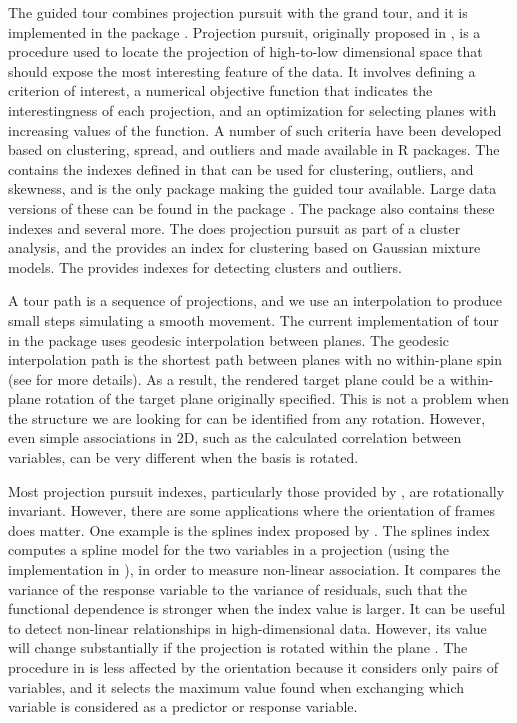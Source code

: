 The guided tour combines projection pursuit with the grand tour, and it is implemented in the  package \citep{tourr}. Projection pursuit, originally proposed in \citet{kruskal_1969}, is a procedure used to locate the projection of high-to-low dimensional space that should expose the most interesting feature of the data. It involves defining a criterion of interest, a numerical objective function that indicates the interestingness of each projection, and an optimization for selecting planes with increasing values of the function. A number of such criteria have been developed based on clustering, spread, and outliers and made available in R packages. The  contains the indexes defined in \citet{cook1993} that can be used for clustering, outliers, and skewness, and is the only package making the guided tour available. Large data versions of these can be found in the package  \citep{ppbigdata}. The package  \citep{pursuit} also contains these indexes and several more. The  \citep{ppci} does projection pursuit as part of a cluster analysis, and the  \citep{ppgmmga} provides an index for clustering based on Gaussian mixture models. The  \citep{REPPlab} provides indexes for detecting clusters and outliers.

A tour path is a sequence of projections, and we use an interpolation to produce small steps simulating a smooth movement. The current implementation of tour in the  package uses geodesic interpolation between planes. The geodesic interpolation path is the shortest path between planes with no within-plane spin (see \citet{Buja2004TheoryOD} for more details). As a result, the rendered target plane could be a within-plane rotation of the target plane originally specified. This is not a problem when the structure we are looking for can be identified from any rotation. However, even simple associations in 2D, such as the calculated correlation between variables, can be very different when the basis is rotated.

Most projection pursuit indexes, particularly those provided by , are rotationally invariant. However, there are some applications where the orientation of frames does matter. One example is the splines index proposed by \citet{Grimm2016}. The splines index computes a spline model for the two variables in a projection (using the implementation in  \citep{mgcv-gam}), in order to measure non-linear association. It compares the variance of the response variable to the variance of residuals, such that the functional dependence is stronger when the index value is larger. It can be useful to detect non-linear relationships in high-dimensional data. However, its value will change substantially if the projection is rotated within the plane \citep{pp}. The procedure in \citet{Grimm2016} is less affected by the orientation because it considers only pairs of variables, and it selects the maximum value found when exchanging which variable is considered as a predictor or response variable.

